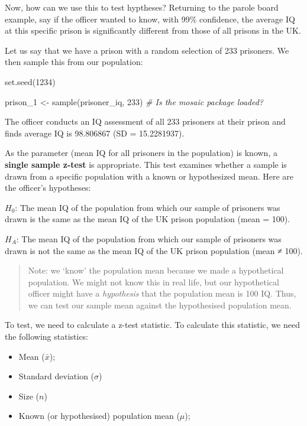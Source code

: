\documentclass[
]{book}
\newenvironment{Shaded}{\begin{snugshade}}{\end{snugshade}}
\newcommand{\CommentTok}[1]{\textcolor[rgb]{0.56,0.35,0.01}{\textit{#1}}}
\newcommand{\DecValTok}[1]{\textcolor[rgb]{0.00,0.00,0.81}{#1}}
\newcommand{\FunctionTok}[1]{\textcolor[rgb]{0.00,0.00,0.00}{#1}}
\newcommand{\NormalTok}[1]{#1}
\newcommand{\OtherTok}[1]{\textcolor[rgb]{0.56,0.35,0.01}{#1}}
\providecommand{\tightlist}{%
  \setlength{\itemsep}{0pt}\setlength{\parskip}{0pt}}
\begin{document}
Now, how can we use this to test hyptheses? Returning to the parole board example, say if the officer wanted to know, with 99\% confidence, the average IQ at this specific prison is significantly different from those of all prisons in the UK.

Let us say that we have a prison with a random selection of 233 prisoners. We then sample this from our population:

\begin{Shaded}
\begin{Highlighting}[]
\FunctionTok{set.seed}\NormalTok{(}\DecValTok{1234}\NormalTok{)}

\NormalTok{prison\_1 }\OtherTok{\textless{}{-}} \FunctionTok{sample}\NormalTok{(prisoner\_iq, }\DecValTok{233}\NormalTok{) }\CommentTok{\# Is the \textquotesingle{}mosaic\textquotesingle{} package loaded?}
\end{Highlighting}
\end{Shaded}

The officer conducts an IQ assessment of all 233 prisoners at their prison and finds average IQ is 98.806867 (SD = 15.2281937).

As the parameter (mean IQ for all prisoners in the population) is known, a \textbf{single sample z-test} is appropriate. This test examines whether a sample is drawn from a specific population with a known or hypothesized mean. Here are the officer's hypotheses:

\(H_0\): The mean IQ of the population from which our sample of prisoners was drawn is the same as the mean IQ of the UK prison population (mean = 100).

\(H_A\): The mean IQ of the population from which our sample of prisoners was drawn is not the same as the mean IQ of the UK prison population (mean ≠ 100).

\begin{quote}
Note: we `know' the population mean because we made a hypothetical population. We might not know this in real life, but our hypothetical officer might have a \emph{hypothesis} that the population mean is 100 IQ. Thus, we can test our sample mean against the hypothesised population mean.
\end{quote}

To test, we need to calculate a z-test statistic. To calculate this statistic, we need the following statistics:

\begin{itemize}
\tightlist
\item
  Mean (\(\bar{x}\));
\item
  Standard deviation (\(\sigma\))
\item
  Size (\(n\))
\item
  Known (or hypothesised) population mean (\(\mu\));
\end{itemize}
\end{document}

